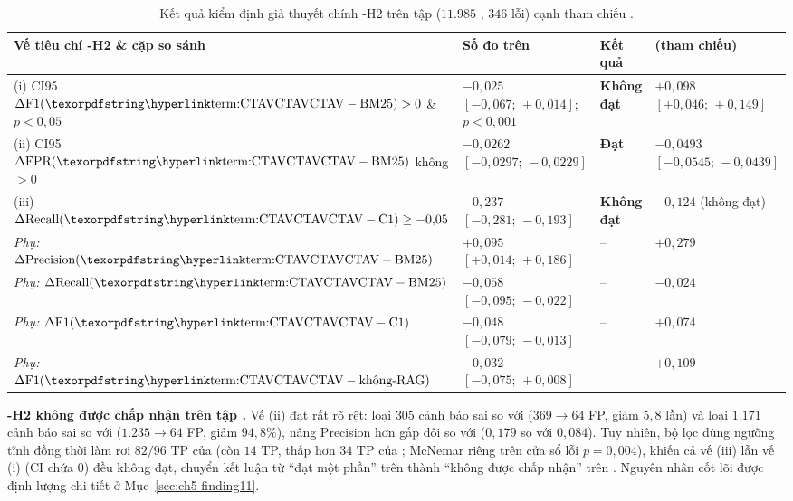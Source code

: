 \begin{table}[H]
  \centering
  \caption[Kiểm định giả thuyết chính H2 trên tập test]{Kết quả kiểm định giả thuyết chính \hyp{H2} trên tập  ($11.985$ , $346$ lỗi) cạnh tham chiếu .}
  \label{tab:ch5-test-h2}
  \tblfont
  \tblsetup
  \setlength{\tabcolsep}{3.5pt}
  \begin{tabularx}{\linewidth}{|Y|>{\raggedright\arraybackslash}p{4.3cm}|l|>{\raggedright\arraybackslash}p{3.3cm}|}
    \hline
    \textbf{Vế tiêu chí \hyp{H2} \& cặp so sánh} & \textbf{Số đo trên } & \textbf{Kết quả} & \textbf{ (tham chiếu)} \\
    \hline
    (i) CI95 $\Delta\text{F1}(\text{\CTAV}-\text{BM25}) > 0$ \& $p < 0{,}05$ & $-0{,}025$ $[-0{,}067;\, +0{,}014]$; $p < 0{,}001$ & \textbf{Không đạt} & $+0{,}098$ $[+0{,}046;\, +0{,}149]$ \\
    \hline
    (ii) CI95 $\Delta\text{FPR}(\text{\CTAV}-\text{BM25})$ không $> 0$ & $-0{,}0262$ $[-0{,}0297;\, -0{,}0229]$ & \textbf{Đạt} & $-0{,}0493$ $[-0{,}0545;\, -0{,}0439]$ \\
    \hline
    (iii) $\Delta\text{Recall}(\text{\CTAV}-\text{C1}) \ge -0{,}05$ & $-0{,}237$ $[-0{,}281;\, -0{,}193]$ & \textbf{Không đạt} & $-0{,}124$ (không đạt) \\
    \hline
    \emph{Phụ:} $\Delta\text{Precision}(\text{\CTAV}-\text{BM25})$ & $+0{,}095$ $[+0{,}014;\, +0{,}186]$ & -- & $+0{,}279$ \\
    \hline
    \emph{Phụ:} $\Delta\text{Recall}(\text{\CTAV}-\text{BM25})$ & $-0{,}058$ $[-0{,}095;\, -0{,}022]$ & -- & $-0{,}024$ \\
    \hline
    \emph{Phụ:} $\Delta\text{F1}(\text{\CTAV}-\text{C1})$ & $-0{,}048$ $[-0{,}079;\, -0{,}013]$ & -- & $+0{,}074$ \\
    \hline
    \emph{Phụ:} $\Delta\text{F1}(\text{\CTAV}-\text{không-RAG})$ & $-0{,}032$ $[-0{,}075;\, +0{,}008]$ & -- & $+0{,}109$ \\
    \hline
  \end{tabularx}
\end{table}

\textbf{\hyp{H2} không được chấp nhận trên tập .} Vế (ii) đạt rất rõ rệt: \CTAV{} loại $305$ cảnh báo sai so với  ($369 \to 64$ FP, giảm $5{,}8$ lần) và loại $1.171$ cảnh báo sai so với  ($1.235 \to 64$ FP, giảm $94{,}8\%$), nâng Precision hơn gấp đôi so với  ($0{,}179$ so với $0{,}084$). Tuy nhiên, bộ lọc  dùng ngưỡng tĩnh  đồng thời làm rơi $82 / 96$ TP của  (còn $14$ TP, thấp hơn $34$ TP của ; McNemar riêng trên cửa sổ lỗi $p = 0{,}004$), khiến cả vế (iii) lẫn vế (i) (CI chứa $0$) đều không đạt, chuyển kết luận từ ``đạt một phần'' trên  thành ``không được chấp nhận'' trên . Nguyên nhân cốt lõi được định lượng chi tiết ở Mục~\ref{sec:ch5-finding11}.

